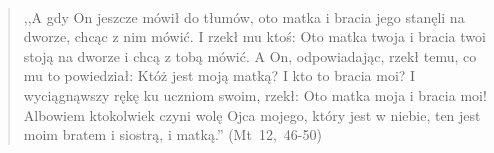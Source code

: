 \documentclass[10pt,a4paper,oneside]{article}
\begin{document}
\paragraph{}
\begin{quote}
,,A gdy On jeszcze mówił do tłumów, oto matka i bracia jego stanęli na dworze, chcąc z nim mówić. I rzekł mu ktoś: Oto matka twoja i bracia twoi stoją na dworze i chcą z tobą mówić. A On, odpowiadając, rzekł temu, co mu to powiedział: Któż jest moją matką? I kto to bracia moi? I wyciągnąwszy rękę ku uczniom swoim, rzekł: Oto matka moja i bracia moi! Albowiem ktokolwiek czyni wolę Ojca mojego, który jest w niebie, ten jest moim bratem i siostrą, i matką.'' \mbox{(Mt 12, 46-50)}
\end{quote}
\end{document}
